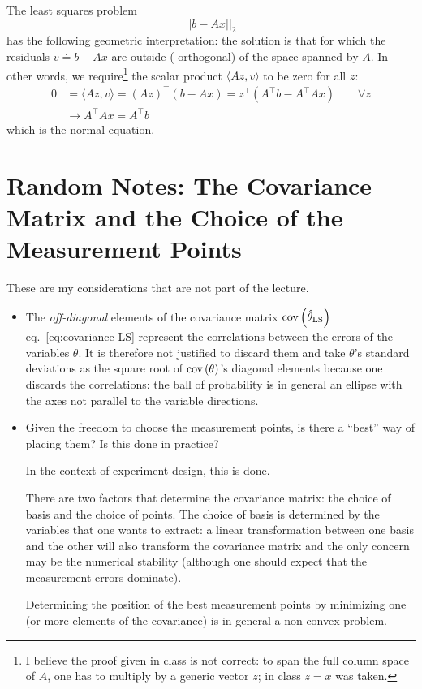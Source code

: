 The least squares problem
\begin{equation*}
  ||b - Ax||_2
\end{equation*}
has the following geometric interpretation: the solution is that for which the residuals $v \doteq b - Ax$ are outside ( orthogonal) of the space spanned by $A$.
In other words, we require\footnote{I believe the proof given in class is not correct: to span the full column space of $A$, one has to multiply by a generic vector $z$; in class $z=x$ was taken.} the scalar product $\langle Az, v\rangle$ to be zero for all $z$:
\begin{align*}
  0 &= \langle Az, v\rangle = (Az)^\top(b-Ax) = z^\top \left(A^\top b - A^\top Ax\right)\hspace{2em}\forall z \\
    &\rightarrow A^\top Ax = A^\top b
\end{align*}
which is the normal equation.


\section{Random Notes: The Covariance Matrix and the Choice of the Measurement Points}
\label{question-covariance}

These are my considerations that are not part of the lecture.

\begin{itemize}
\item The \emph{off-diagonal} elements of the covariance matrix $\textrm{cov}\left(\hat{\theta}_\textrm{LS}\right)$ eq.~\eqref{eq:covariance-LS} represent the correlations between the errors of the variables $\theta$.
It is therefore not justified to discard them and take $\theta$'s standard deviations as the square root of $\textrm{cov}\left(\theta\right)$'s diagonal elements because one discards the correlations: the ball of probability is in general an ellipse with the axes not parallel to the variable directions.

\item Given the freedom to choose the measurement points, is there a ``best'' way of placing them? Is this done in practice?

  In the context of experiment design, this is done.

  There are two factors that determine the covariance matrix: the choice of basis and the choice of points.
  The choice of basis is determined by the variables that one wants to extract: a linear transformation between one basis and the other will also transform the covariance matrix and the only concern may be the numerical stability (although one should expect that the measurement errors dominate).

  Determining the position of the best measurement points by minimizing one (or more elements of the covariance) is in general a non-convex problem.
\end{itemize}

